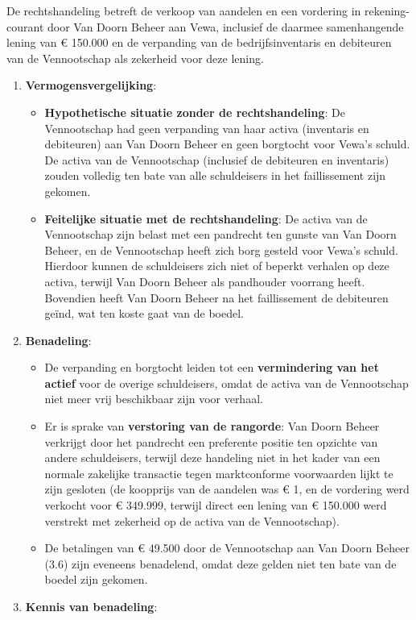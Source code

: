 \documentclass[
  dutch,
  a4paper,
]{article}
\providecommand{\tightlist}{%
  \setlength{\itemsep}{0pt}\setlength{\parskip}{0pt}}
\begin{document}
De rechtshandeling betreft de verkoop van aandelen en een vordering in rekening-courant door Van Doorn Beheer aan Vewa, inclusief de daarmee samenhangende lening van € 150.000 en de verpanding van de bedrijfsinventaris en debiteuren van de Vennootschap als zekerheid voor deze lening.

\begin{enumerate}
\def\labelenumi{\arabic{enumi}.}
\tightlist
\item
  \textbf{Vermogensvergelijking}:

  \begin{itemize}
  \tightlist
  \item
    \textbf{Hypothetische situatie zonder de rechtshandeling}: De Vennootschap had geen verpanding van haar activa (inventaris en debiteuren) aan Van Doorn Beheer en geen borgtocht voor Vewa's schuld. De activa van de Vennootschap (inclusief de debiteuren en inventaris) zouden volledig ten bate van alle schuldeisers in het faillissement zijn gekomen.
  \item
    \textbf{Feitelijke situatie met de rechtshandeling}: De activa van de Vennootschap zijn belast met een pandrecht ten gunste van Van Doorn Beheer, en de Vennootschap heeft zich borg gesteld voor Vewa's schuld. Hierdoor kunnen de schuldeisers zich niet of beperkt verhalen op deze activa, terwijl Van Doorn Beheer als pandhouder voorrang heeft. Bovendien heeft Van Doorn Beheer na het faillissement de debiteuren geïnd, wat ten koste gaat van de boedel.
  \end{itemize}
\item
  \textbf{Benadeling}:

  \begin{itemize}
  \tightlist
  \item
    De verpanding en borgtocht leiden tot een \textbf{vermindering van het actief} voor de overige schuldeisers, omdat de activa van de Vennootschap niet meer vrij beschikbaar zijn voor verhaal.
  \item
    Er is sprake van \textbf{verstoring van de rangorde}: Van Doorn Beheer verkrijgt door het pandrecht een preferente positie ten opzichte van andere schuldeisers, terwijl deze handeling niet in het kader van een normale zakelijke transactie tegen marktconforme voorwaarden lijkt te zijn gesloten (de koopprijs van de aandelen was € 1, en de vordering werd verkocht voor € 349.999, terwijl direct een lening van € 150.000 werd verstrekt met zekerheid op de activa van de Vennootschap).
  \item
    De betalingen van € 49.500 door de Vennootschap aan Van Doorn Beheer (3.6) zijn eveneens benadelend, omdat deze gelden niet ten bate van de boedel zijn gekomen.
  \end{itemize}
\item
  \textbf{Kennis van benadeling}:


\end{enumerate}
\end{document}
